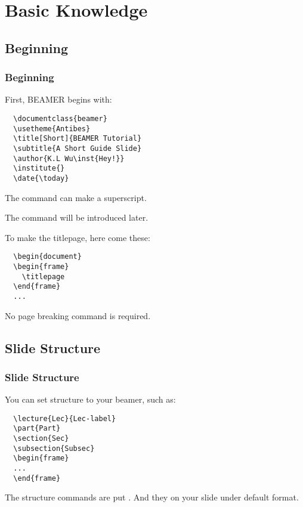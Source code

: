 \documentclass{beamer}
\newcommand{\Beamer}{\textrm{BEAMER}}
\newcommand{\cmd}[2][blue]{{\color{#1}{\ttfamily\char92 #2}}}
\newcommand{\imp}[1]{{\color{red}{#1}}}
\newcommand{\dpar}{\\ \mbox{}}
\begin{document}
\section{Basic Knowledge}
\subsection{Beginning}
\begin{frame}[fragile]
  \frametitle{Beginning}
  First, \Beamer{} begins with:
  \begin{lstlisting}
  \documentclass{beamer}
  \usetheme{Antibes}
  \title[Short]{BEAMER Tutorial}
  \subtitle{A Short Guide Slide}
  \author{K.L Wu\inst{Hey!}}
  \institute{}
  \date{\today}
  \end{lstlisting}
  
  The \cmd[orange]{inst} command can make a superscript. 
  
  The \cmd{usetheme} command will be introduced later. 
\end{frame}

\begin{frame}[fragile]
  To make the titlepage, here come these:
  \begin{lstlisting}
  \begin{document}
  \begin{frame}
    \titlepage
  \end{frame}
  ...
  \end{lstlisting}
  \imp{Things in a frame environment will be put in a single slide(i.e. page).} No page breaking command is required. 
\end{frame}

\subsection{Slide Structure}
\begin{frame}[fragile]
  \frametitle{Slide Structure}
  You can set structure to your beamer, such as:
  \begin{lstlisting}
  \lecture{Lec}{Lec-label}
  \part{Part}
  \section{Sec}
  \subsection{Subsec}
  \begin{frame}
  ...
  \end{frame}
  \end{lstlisting}
  The structure commands are put \imp{outside of frame environment}. And they \imp{won't appear} on your slide under default format. \dpar
\end{frame}
\end{document}
